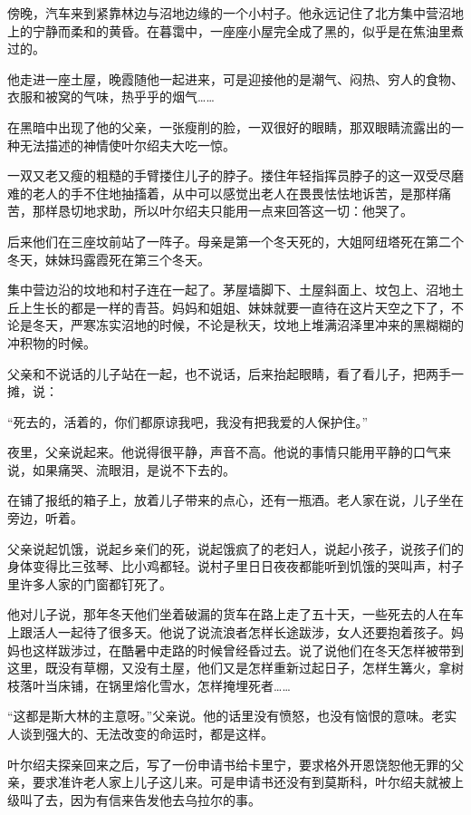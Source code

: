 傍晚，汽车来到紧靠林边与沼地边缘的一个小村子。他永远记住了北方集中营沼地上的宁静而柔和的黄昏。在暮霭中，一座座小屋完全成了黑的，似乎是在焦油里煮过的。

他走进一座土屋，晚霞随他一起进来，可是迎接他的是潮气、闷热、穷人的食物、衣服和被窝的气味，热乎乎的烟气……

在黑暗中出现了他的父亲，一张瘦削的脸，一双很好的眼睛，那双眼睛流露出的一种无法描述的神情使叶尔绍夫大吃一惊。

一双又老又瘦的粗糙的手臂搂住儿子的脖子。搂住年轻指挥员脖子的这一双受尽磨难的老人的手不住地抽搐着，从中可以感觉出老人在畏畏怯怯地诉苦，是那样痛苦，那样恳切地求助，所以叶尔绍夫只能用一点来回答这一切：他哭了。

后来他们在三座坟前站了一阵子。母亲是第一个冬天死的，大姐阿纽塔死在第二个冬天，妹妹玛露霞死在第三个冬天。

集中营边沿的坟地和村子连在一起了。茅屋墙脚下、土屋斜面上、坟包上、沼地土丘上生长的都是一样的青苔。妈妈和姐姐、妹妹就要一直待在这片天空之下了，不论是冬天，严寒冻实沼地的时候，不论是秋天，坟地上堆满沼泽里冲来的黑糊糊的冲积物的时候。

父亲和不说话的儿子站在一起，也不说话，后来抬起眼睛，看了看儿子，把两手一摊，说：

“死去的，活着的，你们都原谅我吧，我没有把我爱的人保护住。”

夜里，父亲说起来。他说得很平静，声音不高。他说的事情只能用平静的口气来说，如果痛哭、流眼泪，是说不下去的。

在铺了报纸的箱子上，放着儿子带来的点心，还有一瓶酒。老人家在说，儿子坐在旁边，听着。

父亲说起饥饿，说起乡亲们的死，说起饿疯了的老妇人，说起小孩子，说孩子们的身体变得比三弦琴、比小鸡都轻。说村子里日日夜夜都能听到饥饿的哭叫声，村子里许多人家的门窗都钉死了。

他对儿子说，那年冬天他们坐着破漏的货车在路上走了五十天，一些死去的人在车上跟活人一起待了很多天。他说了说流浪者怎样长途跋涉，女人还要抱着孩子。妈妈也这样跋涉过，在酷暑中走路的时候曾经昏过去。说了说他们在冬天怎样被带到这里，既没有草棚，又没有土屋，他们又是怎样重新过起日子，怎样生篝火，拿树枝落叶当床铺，在锅里熔化雪水，怎样掩埋死者……

“这都是斯大林的主意呀。”父亲说。他的话里没有愤怒，也没有恼恨的意味。老实人谈到强大的、无法改变的命运时，都是这样。

叶尔绍夫探亲回来之后，写了一份申请书给卡里宁，要求格外开恩饶恕他无罪的父亲，要求准许老人家上儿子这儿来。可是申请书还没有到莫斯科，叶尔绍夫就被上级叫了去，因为有信来告发他去乌拉尔的事。

